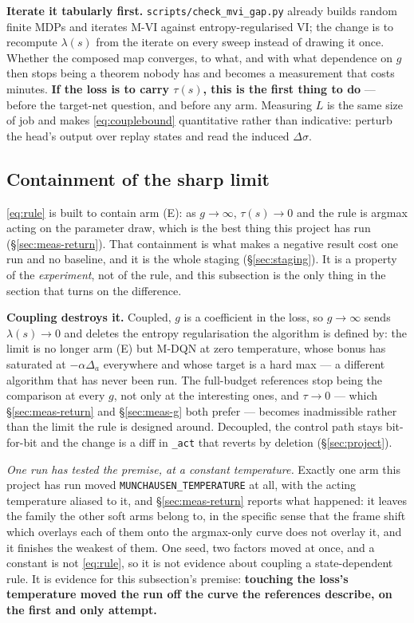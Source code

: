 \documentclass{article}
\newcommand{\gap}{\Delta}
\newcommand{\srank}{\sigma}
\begin{document}
\textbf{Iterate it tabularly first.} \texttt{scripts/check\_mvi\_gap.py} already builds random
finite MDPs and iterates M-VI against entropy-regularised VI; the change is to recompute
$\lambda(s)$ from the iterate on every sweep instead of drawing it once. Whether the composed map
converges, to what, and with what dependence on $g$ then stops being a theorem nobody has and
becomes a measurement that costs minutes. \textbf{If the loss is to carry $\tau(s)$, this is the
first thing to do} --- before the target-net question, and before any arm. Measuring $L$ is the
same size of job and makes \eqref{eq:couplebound} quantitative rather than indicative: perturb
the head's output over replay states and read the induced $\Delta\srank$.

\subsection{Containment of the sharp limit}
\label{sec:c8-staging}

\eqref{eq:rule} is built to contain arm (E): as $g \to \infty$, $\tau(s) \to 0$ and the rule is
argmax acting on the parameter draw, which is the best thing this project has run
(\S\ref{sec:meas-return}). That containment is what makes a negative result cost one run and no
baseline, and it is the whole staging (\S\ref{sec:staging}). It is a property of the
\emph{experiment}, not of the rule, and this subsection is the only thing in the section that
turns on the difference.

\textbf{Coupling destroys it.} Coupled, $g$ is a coefficient in the loss, so $g \to \infty$ sends
$\lambda(s) \to 0$ and deletes the entropy regularisation the algorithm is defined by: the limit
is no longer arm (E) but M-DQN at zero temperature, whose bonus has saturated at $-\alpha\gap_a$
everywhere and whose target is a hard max --- a different algorithm that has never been run. The
full-budget references stop being the comparison at every $g$, not only at the interesting ones,
and
$\tau \to 0$ --- which \S\ref{sec:meas-return} and \S\ref{sec:meas-g} both prefer --- becomes
inadmissible rather than the limit the rule is designed around. Decoupled, the control path stays
bit-for-bit and the change is a diff in \texttt{\_act} that reverts by deletion
(\S\ref{sec:project}).

\emph{One run has tested the premise, at a constant temperature.} Exactly one arm this project
has run moved \texttt{MUNCHAUSEN\_TEMPERATURE} at all, with the acting temperature aliased to it,
and \S\ref{sec:meas-return} reports what happened: it leaves the family the other soft arms
belong to, in the specific sense that the frame shift which overlays each of them onto the
argmax-only curve does not overlay it, and it finishes the weakest of them. One seed, two factors
moved at once, and a constant is not \eqref{eq:rule}, so it is not evidence about coupling a
state-dependent rule. It is evidence for this subsection's premise: \textbf{touching the loss's
temperature moved the run off the curve the references describe, on the first and only attempt.}
\end{document}
